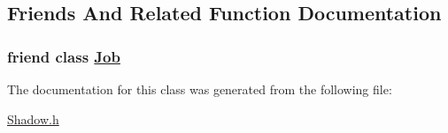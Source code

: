 \subsection{Friends And Related Function Documentation}
\hypertarget{classglite_1_1wmsui_1_1api_1_1Shadow_n0}{
\subsubsection[Job]{\setlength{\rightskip}{0pt plus 5cm}friend class \hyperlink{classglite_1_1wmsui_1_1api_1_1Job}{Job}}}
\label{classglite_1_1wmsui_1_1api_1_1Shadow_n0}




The documentation for this class was generated from the following file:\begin{CompactItemize}
\item 
\hyperlink{Shadow_8h}{Shadow.h}\end{CompactItemize}
